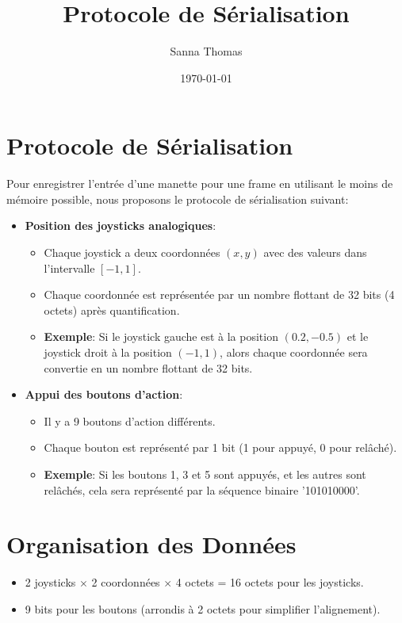 \documentclass{article}
\title{Protocole de Sérialisation}
\author{Sanna Thomas}
\date{\today}
\begin{document}
\maketitle

\section*{Protocole de Sérialisation}

Pour enregistrer l'entrée d'une manette pour une frame en utilisant le moins de mémoire possible, nous proposons le protocole de sérialisation suivant:

\begin{itemize}
  \item \textbf{Position des joysticks analogiques}:
  \begin{itemize}
    \item Chaque joystick a deux coordonnées $(x, y)$ avec des valeurs dans l'intervalle $[-1, 1]$.
    \item Chaque coordonnée est représentée par un nombre flottant de 32 bits (4 octets) après quantification.
    \item \textbf{Exemple}: Si le joystick gauche est à la position $(0.2, -0.5)$ et le joystick droit à la position $(-1, 1)$, alors chaque coordonnée sera convertie en un nombre flottant de 32 bits.
  \end{itemize}
  \item \textbf{Appui des boutons d'action}:
  \begin{itemize}
    \item Il y a 9 boutons d'action différents.
    \item Chaque bouton est représenté par 1 bit (1 pour appuyé, 0 pour relâché).
    \item \textbf{Exemple}: Si les boutons 1, 3 et 5 sont appuyés, et les autres sont relâchés, cela sera représenté par la séquence binaire '101010000'.
  \end{itemize}
\end{itemize}

\section*{Organisation des Données}

\begin{itemize}
  \item 2 joysticks $\times$ 2 coordonnées $\times$ 4 octets = 16 octets pour les joysticks.
  \item 9 bits pour les boutons (arrondis à 2 octets pour simplifier l'alignement).
\end{itemize}
\end{document}
